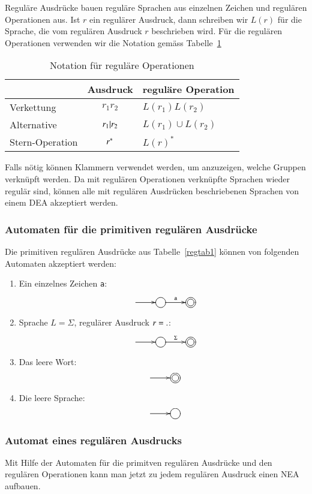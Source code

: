Reguläre Ausdrücke bauen reguläre Sprachen aus einzelnen
Zeichen und regulären Operationen aus.
Ist $r$ ein regulärer Ausdruck, dann schreiben wir  $L(r)$ für die
Sprache, die vom regulären Ausdruck $r$ beschrieben wird.
Für die regulären Operationen verwenden wir die Notation
gemäss Tabelle~\ref{regtab2}
\begin{table}
\begin{center}
\begin{tabular}{|l|c|l|}
\hline
&Ausdruck&reguläre Operation\\
\hline
\index{Verkettung}
Verkettung&$r_1r_2$&$L(r_1)L(r_2)$\\
\index{Alternative}
Alternative&$r_1{\tt |}r_2$&$L(r_1)\cup L(r_2)$\\
\index{*-Operation@$*$-Operation}
Stern-Operation&$r{\mathstrut^{\tt *}}$&$L(r)^*$\\
\hline
\end{tabular}
\end{center}
\caption{Notation für reguläre Operationen\label{regtab2}}
\end{table}
Falls nötig können Klammern verwendet werden, um anzuzeigen,
welche Gruppen verknüpft werden.
Da mit regulären Operationen
verknüpfte Sprachen wieder regulär sind, können alle mit
regulären Ausdrücken beschriebenen Sprachen von einem DEA
akzeptiert werden.

\subsubsection{Automaten für die primitiven regulären Ausdrücke}
Die primitiven regulären Ausdrücke aus Tabelle~\ref{regtab1} können
von folgenden Automaten akzeptiert werden:
\begin{enumerate}
\item Ein einzelnes Zeichen {\tt a}:
\[
\entrymodifiers={++[o][F]}
\xymatrix{
*+\txt{}\ar[r]
	&{}\ar[r]^{\tt a}
		&*++[o][F=]{}
}
\]
\item Sprache $L=\Sigma$, regulärer Ausdruck $r={\tt .}$:
\[
\entrymodifiers={++[o][F]}
\xymatrix{
*+\txt{}\ar[r]
	&{}\ar[r]^{\Sigma}
		&*++[o][F=]{}
}
\]
\item Das leere Wort:
\[
\entrymodifiers={++[o][F]}
\xymatrix{
*+\txt{}\ar[r]
	&*++[o][F=]{}
}
\]
\item Die leere Sprache:
\[
\entrymodifiers={++[o][F]}
\xymatrix{
*+\txt{}\ar[r]
	&{}
}
\]
\end{enumerate}

\subsubsection{Automat eines regulären Ausdrucks}
Mit Hilfe der Automaten für die primitven regulären Ausdrücke
und den regulären Operationen kann man jetzt zu jedem regulären
Ausdruck einen NEA aufbauen.

